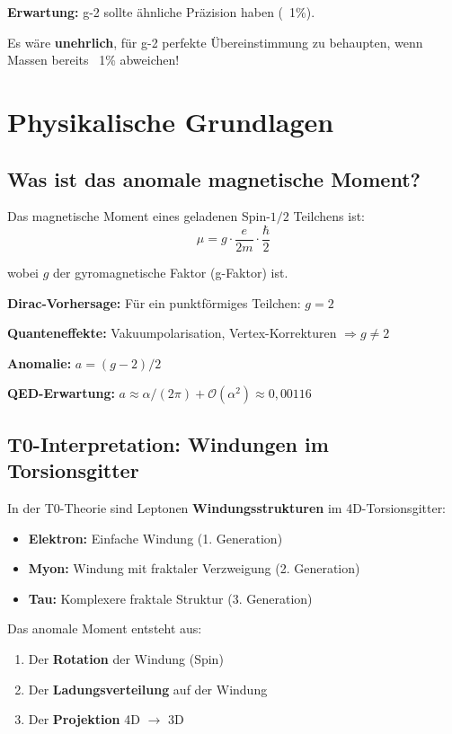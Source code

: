 	\textbf{Erwartung:} g-2 sollte ähnliche Präzision haben (~1\%).
	
	Es wäre \textbf{unehrlich}, für g-2 perfekte Übereinstimmung zu behaupten, wenn Massen bereits ~1\% abweichen!
	
	\section{Physikalische Grundlagen}
	
	\subsection{Was ist das anomale magnetische Moment?}
	
	Das magnetische Moment eines geladenen Spin-$1/2$ Teilchens ist:
	\begin{equation}
		\mu = g \cdot \frac{e}{2m} \cdot \frac{\hbar}{2}
	\end{equation}
	
	wobei $g$ der gyromagnetische Faktor (g-Faktor) ist.
	
	\textbf{Dirac-Vorhersage:} Für ein punktförmiges Teilchen: $g = 2$
	
	\textbf{Quanteneffekte:} Vakuumpolarisation, Vertex-Korrekturen $\Rightarrow g \neq 2$
	
	\textbf{Anomalie:} $a = (g-2)/2$
	
	\textbf{QED-Erwartung:} $a \approx \alpha/(2\pi) + \mathcal{O}(\alpha^2) \approx 0{,}00116$
	
	\subsection{T0-Interpretation: Windungen im Torsionsgitter}
	
	In der T0-Theorie sind Leptonen \textbf{Windungsstrukturen} im 4D-Torsionsgitter:
	
	\begin{itemize}
		\item \textbf{Elektron:} Einfache Windung (1. Generation)
		\item \textbf{Myon:} Windung mit fraktaler Verzweigung (2. Generation)
		\item \textbf{Tau:} Komplexere fraktale Struktur (3. Generation)
	\end{itemize}
	
	Das anomale Moment entsteht aus:
	\begin{enumerate}
		\item Der \textbf{Rotation} der Windung (Spin)
		\item Der \textbf{Ladungsverteilung} auf der Windung
		\item Der \textbf{Projektion} 4D $\to$ 3D
	\end{enumerate}
	
